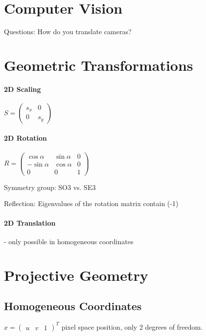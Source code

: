 \section{Computer Vision}

Questions: How do you translate cameras?


\section{Geometric Transformations}

\paragraph{2D Scaling}

$S = \left( \begin{matrix} s_x & 0 \\ 0 & s_y  \end{matrix} \right)$

\paragraph{2D Rotation}

$R = \left(\begin{matrix} \cos  \alpha & \sin \alpha  & 0 \\  -\sin \alpha & \cos \alpha & 0 \\ 0 & 0 & 1  \end{matrix} \right)$

Symmetry group: SO3 vs. SE3

Reflection: Eigenvalues of the rotation matrix contain (-1)

\paragraph{2D Translation} - only possible in homogeneous coordinates

\section{Projective Geometry}

\subsection{Homogeneous Coordinates}

$x = \left(\begin{matrix} u & v & 1 \end{matrix}\right)^T$ pixel space position, only 2 degrees of freedom.

